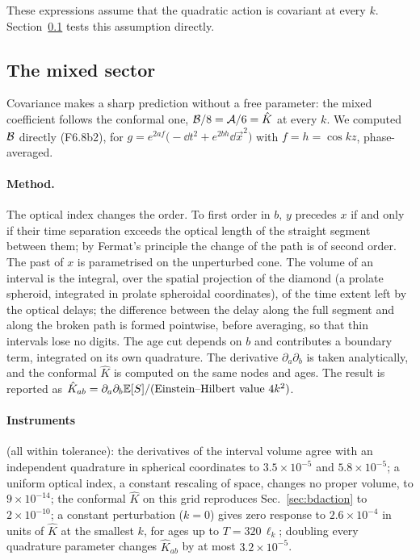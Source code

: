 These expressions assume that the quadratic action is covariant at every $k$. Section~\ref{sec:mixed}
tests this assumption directly.

\subsection{The mixed sector}\label{sec:mixed}

Covariance makes a sharp prediction without a free parameter: the mixed coefficient follows the
conformal one, $\mathcal{B}/8=\mathcal{A}/6=\hat K$ at every $k$. We computed $\mathcal{B}$ directly (F6.8b2), for
$g=e^{2af}\big(-\dd t^2+e^{2bh}\dd\vec x^2\big)$ with $f=h=\cos kz$, phase-averaged.

\paragraph{Method.} The optical index changes the order. To first order in $b$, $y$ precedes $x$ if and
only if their time separation exceeds the optical length of the straight segment between them; by
Fermat's principle the change of the path is of second order. The past of $x$ is parametrised on the
unperturbed cone. The volume of an interval is the integral, over the spatial projection of the diamond
(a prolate spheroid, integrated in prolate spheroidal coordinates), of the time extent left by the
optical delays; the difference between the delay along the full segment and along the broken path is
formed pointwise, before averaging, so that thin intervals lose no digits. The age cut depends on $b$ and
contributes a boundary term, integrated on its own quadrature. The derivative $\partial_a\partial_b$ is
taken analytically, and the conformal $\hat K$ is computed on the same nodes and ages. The result is
reported as $\hat K_{ab}=\partial_a\partial_b\mathbb{E}[S]/(\text{Einstein--Hilbert value }4k^2)$.

\paragraph{Instruments} (all within tolerance): the derivatives of the interval volume agree with an
independent quadrature in spherical coordinates to $3.5\times10^{-5}$ and $5.8\times10^{-5}$; a uniform
optical index, a constant rescaling of space, changes no proper volume, to $9\times10^{-14}$; the
conformal $\hat K$ on this grid reproduces Sec.~\ref{sec:bdaction} to $2\times10^{-10}$; a constant
perturbation ($k=0$) gives zero response to $2.6\times10^{-4}$ in units of $\hat K$ at the smallest $k$,
for ages up to $T=320\,\ell_k$; doubling every quadrature parameter changes $\hat K_{ab}$ by at most
$3.2\times10^{-5}$.

